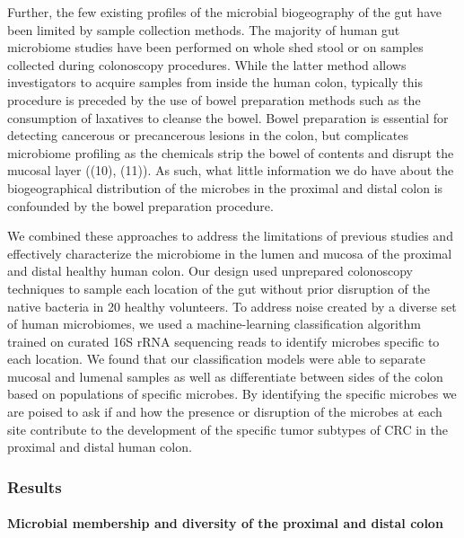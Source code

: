 \documentclass[11pt,]{article}
\let\oldparagraph\paragraph
\renewcommand{\paragraph}[1]{\oldparagraph{#1}\mbox{}}
\begin{document}
Further, the few existing profiles of the microbial biogeography of the
gut have been limited by sample collection methods. The majority of
human gut microbiome studies have been performed on whole shed stool or
on samples collected during colonoscopy procedures. While the latter
method allows investigators to acquire samples from inside the human
colon, typically this procedure is preceded by the use of bowel
preparation methods such as the consumption of laxatives to cleanse the
bowel. Bowel preparation is essential for detecting cancerous or
precancerous lesions in the colon, but complicates microbiome profiling
as the chemicals strip the bowel of contents and disrupt the mucosal
layer ((10), (11)). As such, what little information we do have about
the biogeographical distribution of the microbes in the proximal and
distal colon is confounded by the bowel preparation procedure.

We combined these approaches to address the limitations of previous
studies and effectively characterize the microbiome in the lumen and
mucosa of the proximal and distal healthy human colon. Our design used
unprepared colonoscopy techniques to sample each location of the gut
without prior disruption of the native bacteria in 20 healthy
volunteers. To address noise created by a diverse set of human
microbiomes, we used a machine-learning classification algorithm trained
on curated 16S rRNA sequencing reads to identify microbes specific to
each location. We found that our classification models were able to
separate mucosal and lumenal samples as well as differentiate between
sides of the colon based on populations of specific microbes. By
identifying the specific microbes we are poised to ask if and how the
presence or disruption of the microbes at each site contribute to the
development of the specific tumor subtypes of CRC in the proximal and
distal human colon.

\subsubsection{Results}\label{results}

\paragraph{Microbial membership and diversity of the proximal and distal
colon}\label{microbial-membership-and-diversity-of-the-proximal-and-distal-colon}
\end{document}

